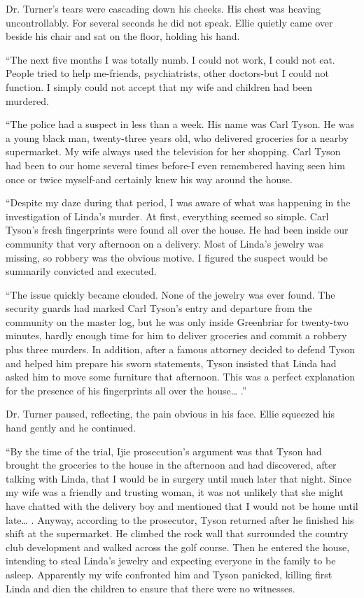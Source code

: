 \documentclass[]{article}
\begin{document}
{Dr.  Turner’s tears were cascading down his cheeks.  His chest was heaving uncontrollably.  For several seconds he did not speak.  Ellie quietly came over beside his chair and sat on the floor, holding his hand.

“The next five months I was totally numb.  I could not work, I could not eat.  People tried to help me-friends, psychiatrists, other doctors-but I could not function.  I simply could not accept that my wife and children had been murdered.

“The police had a suspect in less than a week.  His name was Carl Tyson.  He was a young black man, twenty-three years old, who delivered groceries for a nearby supermarket.  My wife always used the television for her shopping.  Carl Tyson had been to our home several times before-I even remembered having seen him once or twice myself-and certainly knew his way around the house.

“Despite my daze during that period, I was aware of what was happening in the investigation of Linda’s murder.  At first, everything seemed so simple.  Carl Tyson’s fresh fingerprints were found all over the house.  He had been inside our community that very afternoon on a delivery.  Most of Linda’s jewelry was missing, so robbery was the obvious motive.  I figured the suspect would be summarily convicted and executed.

“The issue quickly became clouded.  None of the jewelry was ever found.  The security guards had marked Carl Tyson’s entry and departure from the community on the master log, but he was only inside Greenbriar for twenty-two minutes, hardly enough time for him to deliver groceries and commit a robbery plus three murders.  In addition, after a famous attorney decided to defend Tyson and helped him prepare his sworn statements, Tyson insisted that Linda had asked him to move some furniture that afternoon.  This was a perfect explanation for the presence of his fingerprints all over the house… .”

Dr.  Turner paused, reflecting, the pain obvious in his face.  Ellie squeezed his hand gently and he continued.

“By the time of the trial, Ijie prosecution’s argument was that Tyson had brought the groceries to the house in the afternoon and had discovered, after talking with Linda, that I would be in surgery until much later that night.  Since my wife was a friendly and trusting woman, it was not unlikely that she might have chatted with the delivery boy and mentioned that I would not be home until late… .  Anyway, according to the prosecutor, Tyson returned after he finished his shift at the supermarket.  He climbed the rock wall that surrounded the country club development and walked across the golf course.  Then he entered the house, intending to steal Linda’s jewelry and expecting everyone in the family to be asleep.  Apparently my wife confronted him and Tyson panicked, killing first Linda and dien the children to ensure that there were no witnesses.

}
\end{document}
